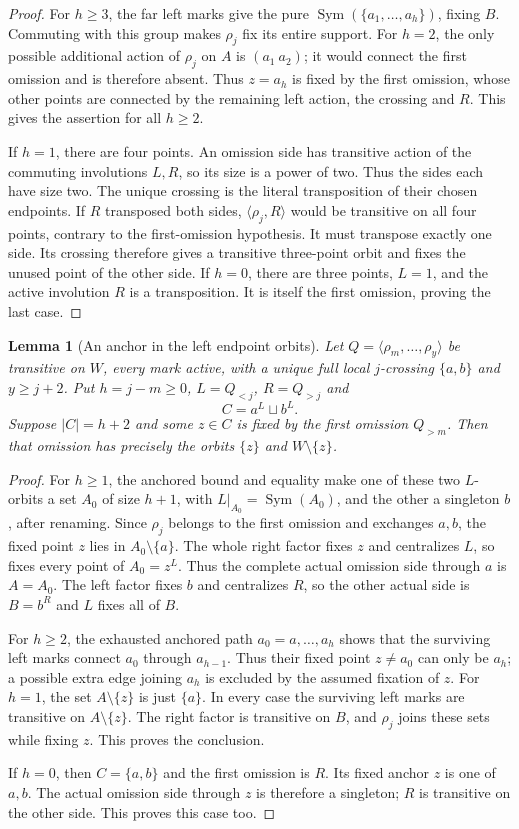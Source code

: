 \documentclass[11pt,a4paper]{article}
\newtheorem{lemma}{Lemma}
\newcommand{\gen}[1]{\langle#1\rangle}
\newcommand{\Sym}{\operatorname{Sym}}
\begin{document}
\begin{proof}
For $h\ge3$, the far left marks give the pure
$\Sym(\{a_1,\ldots,a_h\})$, fixing $B$.
Commuting with this group makes $\rho_j$ fix
its entire support. For $h=2$, the only possible
additional action of $\rho_j$ on $A$ is
$(a_1\ a_2)$; it would connect the first omission
and is therefore absent. Thus $z=a_h$ is fixed
by the first omission, whose other points are
connected by the remaining left action, the
crossing and $R$. This gives the assertion for
all $h\ge2$.

If $h=1$, there are four points. An omission
side has transitive action of the commuting
involutions $L,R$, so its size is a power of two.
Thus the sides each have size two. The unique
crossing is the literal transposition of their
chosen endpoints. If $R$ transposed both sides,
$\gen{\rho_j,R}$ would be transitive on all four
points, contrary to the first-omission hypothesis.
It must transpose exactly one side. Its crossing
therefore gives a transitive three-point orbit
and fixes the unused point of the other side.
If $h=0$, there are three points, $L=1$, and
the active involution $R$ is a transposition.
It is itself the first omission, proving the
last case.
\end{proof}

\begin{lemma}[An anchor in the left endpoint orbits]
Let $Q=\gen{\rho_m,\ldots,\rho_y}$ be transitive
on $W$, every mark active, with a unique full
local $j$-crossing $\{a,b\}$ and $y\ge j+2$.
Put $h=j-m\ge0$, $L=Q_{<j}$, $R=Q_{>j}$ and
\[
                      C=a^L\sqcup b^L.
\]
Suppose $|C|=h+2$ and some $z\in C$ is fixed
by the first omission $Q_{>m}$. Then that omission
has precisely the orbits $\{z\}$ and $W\setminus\{z\}$.
\end{lemma}
\begin{proof}
For $h\ge1$, the anchored bound and equality
make one of these two $L$-orbits a set $A_0$
of size $h+1$, with $L|_{A_0}=\Sym(A_0)$,
and the other a singleton $b$, after renaming.
Since $\rho_j$ belongs to the first omission
and exchanges $a,b$, the fixed point $z$ lies
in $A_0\setminus\{a\}$. The whole right factor
fixes $z$ and centralizes $L$, so fixes every
point of $A_0=z^L$. Thus the complete actual
omission side through $a$ is $A=A_0$.
The left factor fixes $b$ and centralizes $R$,
so the other actual side is $B=b^R$ and
$L$ fixes all of $B$.

For $h\ge2$, the exhausted anchored path
$a_0=a,\ldots,a_h$ shows that the surviving
left marks connect $a_0$ through $a_{h-1}$.
Thus their fixed point $z\ne a_0$ can only be
$a_h$; a possible extra edge joining $a_h$
is excluded by the assumed fixation of $z$.
For $h=1$, the set $A\setminus\{z\}$ is just
$\{a\}$. In every case the surviving left
marks are transitive on $A\setminus\{z\}$.
The right factor is transitive on $B$, and
$\rho_j$ joins these sets while fixing $z$.
This proves the conclusion.

If $h=0$, then $C=\{a,b\}$ and the first
omission is $R$. Its fixed anchor $z$ is one
of $a,b$. The actual omission side through
$z$ is therefore a singleton; $R$ is transitive
on the other side. This proves this case too.
\end{proof}
\end{document}
